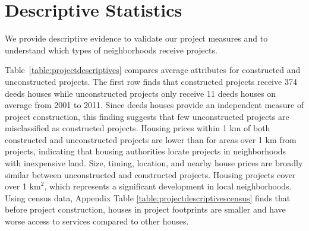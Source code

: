 \documentclass[12pt]{article}
\begin{document}





\section{Descriptive Statistics}\label{section:descriptives}


We provide descriptive evidence to validate our project measures and to understand which types of neighborhoods receive projects.

Table~\ref{table:projectdescriptives} compares average attributes for constructed and unconstructed projects.  The first row finds that constructed projects receive 374 deeds houses while unconstructed projects only receive 11 deeds houses on average from 2001 to 2011.  Since deeds houses provide an independent measure of project construction, this finding suggests that few unconstructed projects are misclassified as constructed projects.  Housing prices within 1 km of both constructed and unconstructed projects are lower than for areas over 1 km from projects, indicating that housing authorities locate projects in neighborhoods with inexpensive land.  Size, timing, location, and nearby house prices are broadly similar between unconstructed and constructed projects.  Housing projects cover over 1 $\text{km}^{2}$, which represents a significant development in local neighborhoods.  Using census data, Appendix Table \ref{table:projectdescriptivescensus} finds that before project construction, houses in project footprints are smaller and have worse access to services compared to other houses.  



\end{document}
